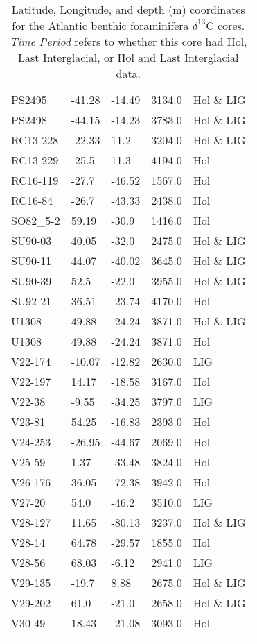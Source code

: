 \begin{longtable}{lllrl}
           PS2495 &   -41.28 &    -14.49 &     3134.0 &   Hol \& LIG \\
           PS2498 &   -44.15 &    -14.23 &     3783.0 &   Hol \& LIG \\
         RC13-228 &   -22.33 &      11.2 &     3204.0 &   Hol \& LIG \\
         RC13-229 &    -25.5 &      11.3 &     4194.0 &         Hol \\
         RC16-119 &    -27.7 &    -46.52 &     1567.0 &         Hol \\
          RC16-84 &    -26.7 &    -43.33 &     2438.0 &         Hol \\
         SO82\_5-2 &    59.19 &     -30.9 &     1416.0 &         Hol \\
          SU90-03 &    40.05 &     -32.0 &     2475.0 &   Hol \& LIG \\
          SU90-11 &    44.07 &    -40.02 &     3645.0 &   Hol \& LIG \\
          SU90-39 &     52.5 &     -22.0 &     3955.0 &   Hol \& LIG \\
          SU92-21 &    36.51 &    -23.74 &     4170.0 &         Hol \\
            U1308 &    49.88 &    -24.24 &     3871.0 &   Hol \& LIG \\
            U1308 &    49.88 &    -24.24 &     3871.0 &         Hol \\
          V22-174 &   -10.07 &    -12.82 &     2630.0 &         LIG \\
          V22-197 &    14.17 &    -18.58 &     3167.0 &         Hol \\
           V22-38 &    -9.55 &    -34.25 &     3797.0 &         LIG \\
           V23-81 &    54.25 &    -16.83 &     2393.0 &         Hol \\
          V24-253 &   -26.95 &    -44.67 &     2069.0 &         Hol \\
           V25-59 &     1.37 &    -33.48 &     3824.0 &         Hol \\
          V26-176 &    36.05 &    -72.38 &     3942.0 &         Hol \\
           V27-20 &     54.0 &     -46.2 &     3510.0 &         LIG \\
          V28-127 &    11.65 &    -80.13 &     3237.0 &   Hol \& LIG \\
           V28-14 &    64.78 &    -29.57 &     1855.0 &         Hol \\
           V28-56 &    68.03 &     -6.12 &     2941.0 &         LIG \\
          V29-135 &    -19.7 &      8.88 &     2675.0 &   Hol \& LIG \\
          V29-202 &     61.0 &     -21.0 &     2658.0 &   Hol \& LIG \\
           V30-49 &    18.43 &    -21.08 &     3093.0 &         Hol \\
\caption{Latitude, Longitude, and depth (m) coordinates for the Atlantic benthic foraminifera $\delta^{13}$C cores. \textit{Time Period} refers to whether this core had Hol, Last Interglacial, or Hol and Last Interglacial data.}\end{longtable}
